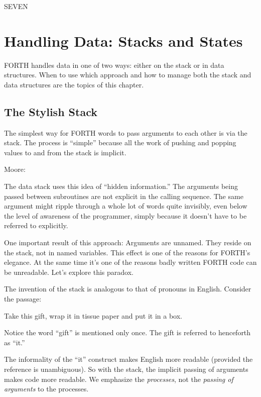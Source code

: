 
SEVEN

\chapter{Handling Data: Stacks and States}

FORTH handles data in one of two ways: either on the stack or in data
structures. When to use which approach and how to manage both the
stack and data structures are the topics of this chapter.

\section{The Stylish Stack}

The simplest way for FORTH words to pass arguments to each other is
via the stack. The process is ``simple'' because all the work of pushing
and popping values to and from the stack is implicit.

Moore:

The data stack uses this idea of ``hidden information.'' The arguments
being passed between subroutines are not explicit in the calling sequence.
The same argument might ripple through a whole lot of words quite invisibly,
even below the level of awareness of the programmer, simply because it
doesn't have to be referred to explicitly.

One important result of this approach: Arguments are unnamed. They
reside on the stack, not in named variables. This effect is one of the
reasons for FORTH's elegance. At the same time it's one of the reasons
badly written FORTH code can be unreadable. Let's explore this
paradox.

The invention of the stack is analogous to that of pronouns in
English. Consider the passage:

Take this gift, wrap it in tissue paper and put it in a box.

Notice the word ``gift'' is mentioned only once. The gift is referred to
henceforth as ``it.''

The informality of the ``it'' construct makes English more readable
(provided the reference is unambiguous). So with the stack, the implicit
passing of arguments makes code more readable. We emphasize the
\emph{processes}, not the \emph{passing of arguments} to the processes.

